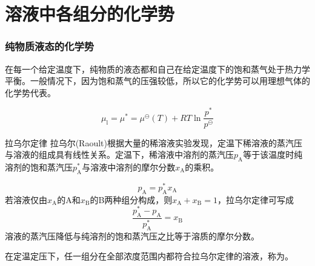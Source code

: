 \section{溶液中各组分的化学势}


\begin{frame}
    \frametitle{纯物质液态的化学势}
    在每一个给定温度下，纯物质的液态都和自己在给定温度下的饱和蒸气处于热力学平衡。一般情况下，因为饱和蒸气的压强较低，所以它的化学势可以用理想气体的化学势代表。
    \begin{center}
    \end{center}
    \[
        \mu_\mathrm{l}=\mu^*=\mu^\ominus(T) +R T \ln \frac{p^*}{p^{\ominus}}
    \]
\end{frame}


\begin{frame}{拉乌尔定律}
    拉乌尔(Raoult)根据大量的稀溶液实验发现，定温下{\color{red}稀溶液}的蒸汽压与溶液的组成具有线性关系。定温下，稀溶液中溶剂的蒸汽压$p_\mathrm{A}$等于该温度时纯溶剂的饱和蒸汽压$p_\mathrm{A}^*$与溶液中溶剂的摩尔分数$x_\mathrm{A}$的乘积。

    \begin{minipage}{0.58\linewidth}
        $$p_\mathrm{A}=p_\mathrm{A}^*x_\mathrm{A}$$
    若溶液仅由$x_\mathrm{A}$的A和$x_\mathrm{B}$的B两种组分构成，则$x_\mathrm{A}+x_\mathrm{B}=1$，拉乌尔定律可写成
    $$\frac{p_\mathrm{A}^*-p_\mathrm{A}}{p_\mathrm{A}^*}=x_\mathrm{B}$$
    溶液的蒸汽压降低与纯溶剂的饱和蒸汽压之比等于溶质的摩尔分数。
    \end{minipage}\hfill
    \begin{minipage}{0.38\linewidth}
        \begin{center}
        \end{center}
    \end{minipage}

    在定温定压下，任一组分在全部浓度范围内都符合拉乌尔定律的溶液，称为。
\end{frame}


